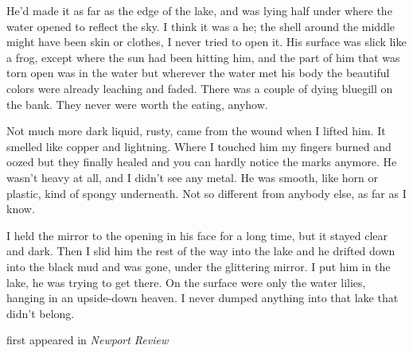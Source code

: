 He'd made it as far as the edge of the lake, and was lying half under
where the water opened to reflect the sky. I think it was a he; the
shell around the middle might have been skin or clothes, I never tried
to open it. His surface was slick like a frog, except where the sun had
been hitting him, and the part of him that was torn open was in the
water but wherever the water met his body the beautiful colors were
already leaching and faded. There was a couple of dying bluegill on the
bank. They never were worth the eating, anyhow.

Not much more dark liquid, rusty, came from the wound when I lifted him.
It smelled like copper and lightning. Where I touched him my fingers
burned and oozed but they finally healed and you can hardly notice the
marks anymore. He wasn't heavy at all, and I didn't see any metal. He
was smooth, like horn or plastic, kind of spongy underneath. Not so
different from anybody else, as far as I know.

I held the mirror to the opening in his face for a long time, but it
stayed clear and dark. Then I slid him the rest of the way into the lake
and he drifted down into the black mud and was gone, under the
glittering mirror. I put him in the lake, he was trying to get there. On
the surface were only the water lilies, hanging in an upside-down
heaven. I never dumped anything into that lake that didn't belong.

first appeared in \emph{Newport Review}
